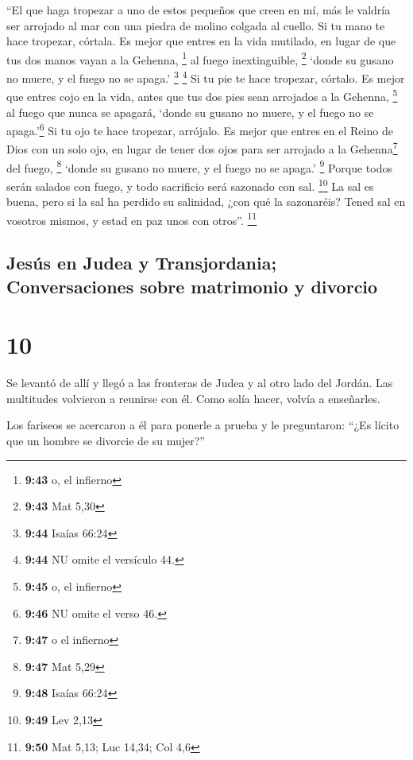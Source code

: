  ``El que haga tropezar a uno de estos pequeños que creen
en mí, más le valdría ser arrojado al mar con una piedra de molino
colgada al cuello.  Si tu mano te hace tropezar, córtala.
Es mejor que entres en la vida mutilado, en lugar de que tus dos manos
vayan a la Gehenna, \footnote{\textbf{9:43} o, el infierno} al fuego
inextinguible, \footnote{\textbf{9:43} Mat 5,30}  `donde
su gusano no muere, y el fuego no se apaga.' \footnote{\textbf{9:44}
  Isaías 66:24} \footnote{\textbf{9:44} NU omite el versículo 44.}
 Si tu pie te hace tropezar, córtalo. Es mejor que entres
cojo en la vida, antes que tus dos pies sean arrojados a la Gehenna,
\footnote{\textbf{9:45} o, el infierno} al fuego que nunca se apagará,
 `donde su gusano no muere, y el fuego no se
apaga.'\footnote{\textbf{9:46} NU omite el verso 46.}  Si
tu ojo te hace tropezar, arrójalo. Es mejor que entres en el Reino de
Dios con un solo ojo, en lugar de tener dos ojos para ser arrojado a la
Gehenna\footnote{\textbf{9:47} o el infierno} del fuego, \footnote{\textbf{9:47}
  Mat 5,29}  `donde su gusano no muere, y el fuego no se
apaga.' \footnote{\textbf{9:48} Isaías 66:24}  Porque
todos serán salados con fuego, y todo sacrificio será sazonado con sal.
\footnote{\textbf{9:49} Lev 2,13}  La sal es buena, pero
si la sal ha perdido su salinidad, ¿con qué la sazonaréis? Tened sal en
vosotros mismos, y estad en paz unos con otros''. \footnote{\textbf{9:50}
  Mat 5,13; Luc 14,34; Col 4,6}

\hypertarget{jesuxfas-en-judea-y-transjordania-conversaciones-sobre-matrimonio-y-divorcio}{%
\subsection{Jesús en Judea y Transjordania; Conversaciones sobre
matrimonio y
divorcio}\label{jesuxfas-en-judea-y-transjordania-conversaciones-sobre-matrimonio-y-divorcio}}

\hypertarget{section-9}{%
\section{10}\label{section-9}}

 Se levantó de allí y llegó a las fronteras de Judea y al
otro lado del Jordán. Las multitudes volvieron a reunirse con él. Como
solía hacer, volvía a enseñarles.

 Los fariseos se acercaron a él para ponerle a prueba y le
preguntaron: ``¿Es lícito que un hombre se divorcie de su mujer?''

